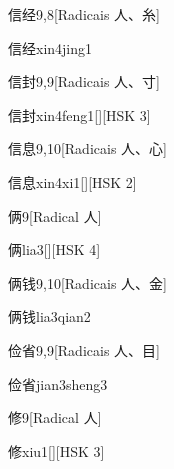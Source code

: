 \begin{entry}{信经}{9,8}[Radicais ⼈、⽷]
  \begin{phonetics}{信经}{xin4jing1}
  \end{phonetics}
\end{entry}

\begin{entry}{信封}{9,9}[Radicais ⼈、⼨]
  \begin{phonetics}{信封}{xin4feng1}[][HSK 3]
  \end{phonetics}
\end{entry}

\begin{entry}{信息}{9,10}[Radicais ⼈、⼼]
  \begin{phonetics}{信息}{xin4xi1}[][HSK 2]
  \end{phonetics}
\end{entry}

\begin{entry}{俩}{9}[Radical ⼈]
  \begin{phonetics}{俩}{lia3}[][HSK 4]
  \end{phonetics}
\end{entry}

\begin{entry}{俩钱}{9,10}[Radicais ⼈、⾦]
  \begin{phonetics}{俩钱}{lia3qian2}
  \end{phonetics}
\end{entry}

\begin{entry}{俭省}{9,9}[Radicais ⼈、⽬]
  \begin{phonetics}{俭省}{jian3sheng3}
  \end{phonetics}
\end{entry}

\begin{entry}{修}{9}[Radical ⼈]
  \begin{phonetics}{修}{xiu1}[][HSK 3]
  \end{phonetics}
\end{entry}

